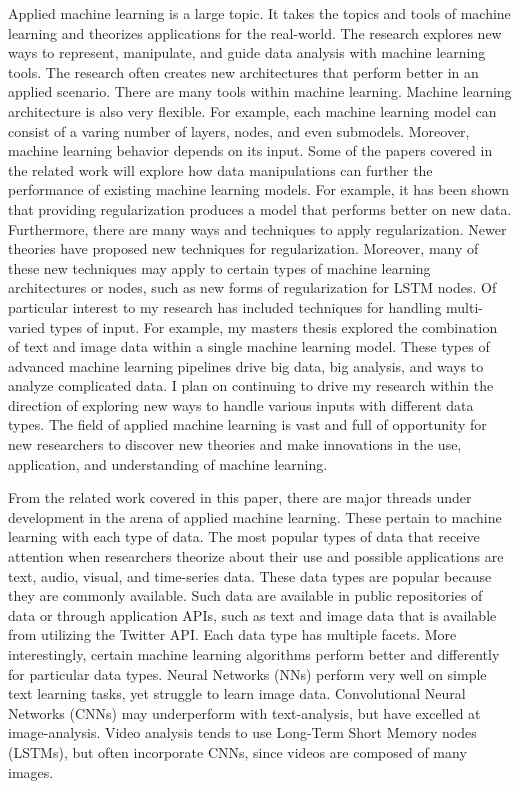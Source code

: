 Applied machine learning is a large topic.  It takes the topics and tools of machine learning and theorizes applications for the real-world.  The research explores new ways to represent, manipulate, and guide data analysis with machine learning tools.  The research often creates new architectures that perform better in an applied scenario. There are many tools within machine learning.  Machine learning architecture is also very flexible.  For example, each machine learning model can consist of a varing number of layers, nodes, and even submodels.  Moreover, machine learning behavior depends on its input.  Some of the papers covered in the related work will explore how data manipulations can further the performance of existing machine learning models.  For example, it has been shown that providing regularization produces a model that performs better on new data.  Furthermore, there are many ways and techniques to apply regularization.  Newer theories have proposed new techniques for regularization.  Moreover, many of these new techniques may apply to certain types of machine learning architectures or nodes, such as new forms of regularization for LSTM nodes.  Of particular interest to my research has included techniques for handling multi-varied types of input.  For example, my masters thesis explored the combination of text and image data within a single machine learning model.  These types of advanced machine learning pipelines drive big data, big analysis, and ways to analyze complicated data.  I plan on continuing to drive my research within the direction of exploring new ways to handle various inputs with different data types.  The field of applied machine learning is vast and full of opportunity for new researchers to discover new theories and make innovations in the use, application, and understanding of machine learning.


From the related work covered in this paper, there are major threads under development in the arena of applied machine learning.  These pertain to machine learning with each type of data.  The most popular types of data that receive attention when researchers theorize about their use and possible applications are text, audio, visual, and time-series data.  These data types are popular because they are commonly available.  Such data are available in public repositories of data or through application APIs, such as text and image data that is available from utilizing the Twitter API.  Each data type has multiple facets.  More interestingly, certain machine learning algorithms perform better and differently for particular data types.  Neural Networks (NNs) perform very well on simple text learning tasks, yet struggle to learn image data.  Convolutional Neural Networks (CNNs) may underperform with text-analysis, but have excelled at image-analysis.  Video analysis tends to use Long-Term Short Memory nodes (LSTMs), but often incorporate CNNs, since videos are composed of many images.

